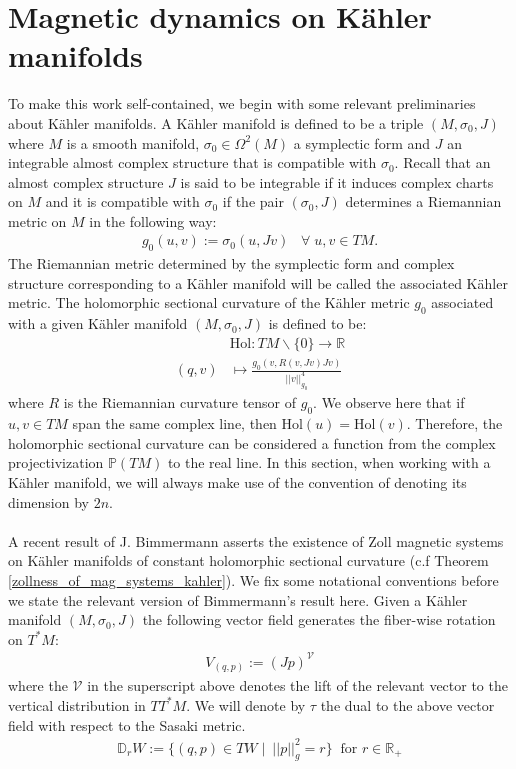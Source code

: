 \documentclass[11pt]{amsart}
\theoremstyle{plain}
\theoremstyle{definition}
\theoremstyle{remark}
\begin{document}
\section{Magnetic dynamics on K\"ahler manifolds}\label{mag_dynamics_on_kahler_section}
To make this work self-contained, we begin with some relevant preliminaries about K\"ahler manifolds. A K\"ahler manifold is defined to be a triple $(M, \sigma_0, J)$ where $M$ is a smooth manifold, $\sigma_0 \in \Omega^2(M)$ a symplectic form and $J$ an integrable almost complex structure that is compatible with $\sigma_0$. Recall that an almost complex structure $J$ is said to be integrable if it induces complex charts on $M$ and it is compatible with $\sigma_0$ if the pair $(\sigma_0, J)$ determines a Riemannian metric on $M$ in the following way:
\begin{align}\label{kahler_metric}
 g_0(u,v):=   \sigma_0(u,Jv)  \;\;\; \forall\; u,v \in TM.
\end{align}
The Riemannian metric determined by the symplectic form and complex structure corresponding to a K\"ahler manifold will be called the associated K\"ahler metric. The holomorphic sectional curvature of the K\"ahler metric $g_0$ associated with a given K\"ahler manifold $(M,\sigma_0,J)$ is defined to be:
\begin{align}\label{def_of_hol_sectional_curvature}
&\text{Hol}: TM \backslash \{0\} \rightarrow \mathbb{R}\\\nonumber
    (q,v) &\longmapsto \frac{g_0(v, R(v,Jv)Jv)}{\vert\vert v\vert\vert_{g_0}^4}
\end{align}
where $R$ is the Riemannian curvature tensor of $g_0$. We observe here that if $u,v \in TM$ span the same complex line, then $\text{Hol}(u)= \text{Hol}(v)$. Therefore, the holomorphic sectional curvature can be considered a function from the complex projectivization $\mathbb{P}(TM)$ to the real line. In this section, when working with a K\"ahler manifold, we will always make use of the convention of denoting its dimension by $2n$.\\
\\
A recent result of J. Bimmermann \cite{johanna_negative_curvature} asserts the existence of Zoll magnetic systems on K\"ahler manifolds of constant holomorphic sectional curvature (c.f Theorem \ref{zollness_of_mag_systems_kahler}). We fix some notational conventions before we state the relevant version of Bimmermann's result here. Given a K\"ahler manifold $(M, \sigma_0, J)$ the following vector field generates the fiber-wise rotation on $T^*M$:
\begin{align}\label{angular_vf_cpn_def}
V_{(q,p)}:= (Jp)^{\mathcal{V}}
\end{align}
where the $\mathcal{V}$ in the superscript above denotes the lift of the relevant vector to the vertical distribution in $TT^*M$. We will denote by $\tau$ the dual to the above vector field with respect to the Sasaki metric. 
 \begin{align}
        \mathbb{D}_rW:=\{(q,p) \in TW\;\big\vert \;\ \vert\vert p\vert\vert^2_{g} = r\} \;\; \text{for $r \in \mathbb{R}_{+}$}
        \end{align}
\end{document}
